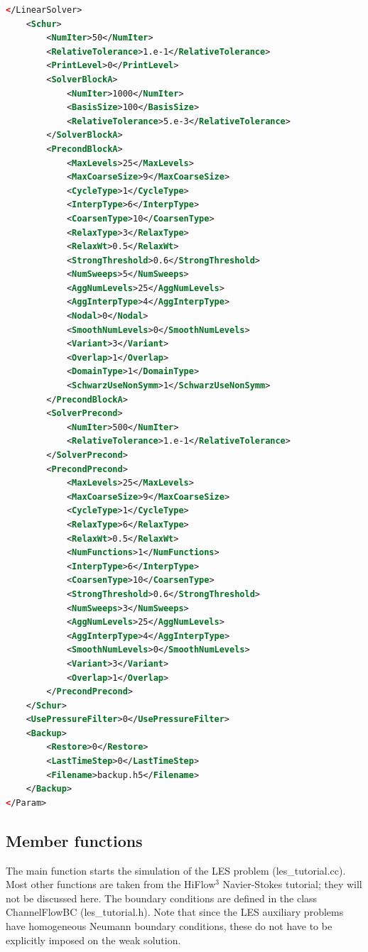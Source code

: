 \documentclass[a4paper, 11pt, twoside]{article}
\begin{document}
\begin{lstlisting}[language=XML, basicstyle={\footnotesize, \ttfamily}, keywordstyle=\color{blue}, numbers=none, tabsize=2]
    </LinearSolver>
    <Schur>
        <NumIter>50</NumIter>
        <RelativeTolerance>1.e-1</RelativeTolerance>
        <PrintLevel>0</PrintLevel>
        <SolverBlockA>
            <NumIter>1000</NumIter>
            <BasisSize>100</BasisSize>
            <RelativeTolerance>5.e-3</RelativeTolerance>
        </SolverBlockA>
        <PrecondBlockA>
            <MaxLevels>25</MaxLevels>
            <MaxCoarseSize>9</MaxCoarseSize>
            <CycleType>1</CycleType>
            <InterpType>6</InterpType>
            <CoarsenType>10</CoarsenType>
            <RelaxType>3</RelaxType>
            <RelaxWt>0.5</RelaxWt>
            <StrongThreshold>0.6</StrongThreshold>
            <NumSweeps>5</NumSweeps>
            <AggNumLevels>25</AggNumLevels>
            <AggInterpType>4</AggInterpType>
            <Nodal>0</Nodal>
            <SmoothNumLevels>0</SmoothNumLevels>
            <Variant>3</Variant>
            <Overlap>1</Overlap>
            <DomainType>1</DomainType>
            <SchwarzUseNonSymm>1</SchwarzUseNonSymm>
        </PrecondBlockA>
        <SolverPrecond>
            <NumIter>500</NumIter>
            <RelativeTolerance>1.e-1</RelativeTolerance>
        </SolverPrecond>
        <PrecondPrecond>
            <MaxLevels>25</MaxLevels>
            <MaxCoarseSize>9</MaxCoarseSize>
            <CycleType>1</CycleType>
            <RelaxType>6</RelaxType>
            <RelaxWt>0.5</RelaxWt>
            <NumFunctions>1</NumFunctions>
            <InterpType>6</InterpType>
            <CoarsenType>10</CoarsenType>
            <StrongThreshold>0.6</StrongThreshold>
            <NumSweeps>3</NumSweeps>
            <AggNumLevels>25</AggNumLevels>
            <AggInterpType>4</AggInterpType>
            <SmoothNumLevels>0</SmoothNumLevels>
            <Variant>3</Variant>
            <Overlap>1</Overlap>
        </PrecondPrecond>
    </Schur>
    <UsePressureFilter>0</UsePressureFilter>
    <Backup>
        <Restore>0</Restore>
        <LastTimeStep>0</LastTimeStep>
        <Filename>backup.h5</Filename>
    </Backup>
</Param>
\end{lstlisting}

\subsection{Member functions}\label{main}
The main function starts the simulation of the LES problem (les\_tutorial.cc). Most other functions are taken from the HiFlow$^3$ Navier-Stokes tutorial; they will not be discussed here. The boundary conditions are defined in the class ChannelFlowBC (les\_tutorial.h). Note that since the LES auxiliary problems have homogeneous Neumann boundary conditions, these do not have to be explicitly imposed on the weak solution.
\end{document}
